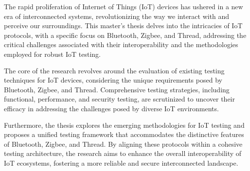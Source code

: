 The rapid proliferation of Internet of Things (IoT) devices has ushered in a new era of interconnected systems, revolutionizing the way we interact with and perceive our surroundings. This master's thesis delves into the intricacies of IoT protocols, with a specific focus on Bluetooth, Zigbee, and Thread, addressing the critical challenges associated with their interoperability and the methodologies employed for robust IoT testing.

The core of the research revolves around the evaluation of existing testing techniques for IoT devices, considering the unique requirements posed by Bluetooth, Zigbee, and Thread. Comprehensive testing strategies, including functional, performance, and security testing, are scrutinized to uncover their efficacy in addressing the challenges posed by diverse IoT environments.

Furthermore, the thesis explores the emerging methodologies for IoT testing and proposes a unified testing framework that accommodates the distinctive features of Bluetooth, Zigbee, and Thread. By aligning these protocols within a cohesive testing architecture, the research aims to enhance the overall interoperability of IoT ecosystems, fostering a more reliable and secure interconnected landscape.



\vfill
\cleardoublepage

\selectthesislanguage

\setcounter{romanPage}{\value{page}}
